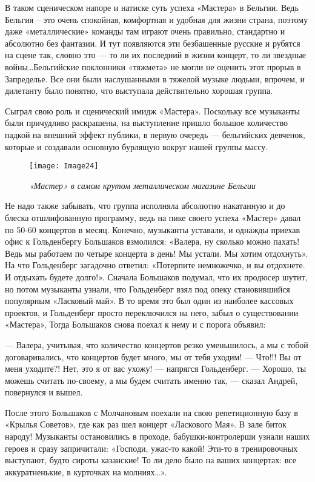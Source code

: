 \documentclass[16pt,a5paper,oneside]{book}
\begin{document}
В таком сценическом напоре и натиске суть успеха «Мастера» в Бельгии. Ведь Бельгия – это очень спокойная, комфортная и
удобная для жизни страна, поэтому даже «металлические» команды там играют очень правильно, стандартно и абсолютно без
фантазии. И тут появляются эти безбашенные русские и рубятся на сцене так, словно это — то ли их последний в жизни
концерт, то ли звездные войны\ldots Бельгийские поклонники «тяжмета» не могли не оценить этот прорыв в Запределье. Все
они были наслушанными в тяжелой музыке людьми, впрочем, и дилетанту было понятно, что выступала действительно хорошая
группа.

Сыграл свою роль и сценический имидж «Мастера». Поскольку все музыканты были причудливо раскрашены, на выступление
пришло большое количество падкой на внешний эффект публики, в первую очередь — бельгийских девченок, которые и создавали
основную бурлящую вокруг нашей группы массу.

\begin{figure}
    \centering
    \texttt{[image: Image24]}
    \caption{\textit{«Мастер» в самом крутом металлическом магазине Бельгии}}
\end{figure}

Не надо также забывать, что группа исполняла абсолютно накатанную и до блеска отшлифованную программу, ведь на пике
своего успеха «Мастер» давал по 50-60 концертов в месяц. Конечно, музыканты уставали, и однажды приехав офис к
Гольденбергу Большаков взмолился: «Валера, ну сколько можно пахать! Ведь мы работаем по четыре концерта в день! Мы
устали. Мы хотим отдохнуть». На что Гольденберг загадочно ответил: «Потерпите немножечко, и вы отдохнете. И отдыхать
будете долго!». Сначала Большаков подумал, что их продюсер шутит, но потом музыканты узнали, что Гольденберг взял под
опеку становившийся популярным «Ласковый май». В то время это был один из наиболее кассовых проектов, и Гольденберг
просто переключился на него, забыл о существовании «Мастера», Тогда Большаков снова поехал к нему и с порога объявил:

— Валера, учитывая, что количество концертов резко уменьшилось, а мы с тобой договаривались, что концертов будет много,
мы от тебя уходим!
— Что!!! Вы от меня уходите?! Нет, это я от вас ухожу! — напрягся Гольденберг.
— Хорошо, ты можешь считать по-своему, а мы будем считать именно так, — сказал Андрей, повернулся и вышел.

После этого Большаков с Молчановым поехали на свою репетиционную базу в «Крылья Советов», где как раз шел концерт
«Ласкового Мая». В зале биток народу! Музыканты остановились в проходе, бабушки-контролерши узнали наших героев и сразу
запричитали: «Господи, ужас-то какой! Эти-то в тренировочных выступают, будто сироты казанские! То ли дело было на ваших
концертах: все аккуратненькие, в курточках на молниях\ldots».
\end{document}
